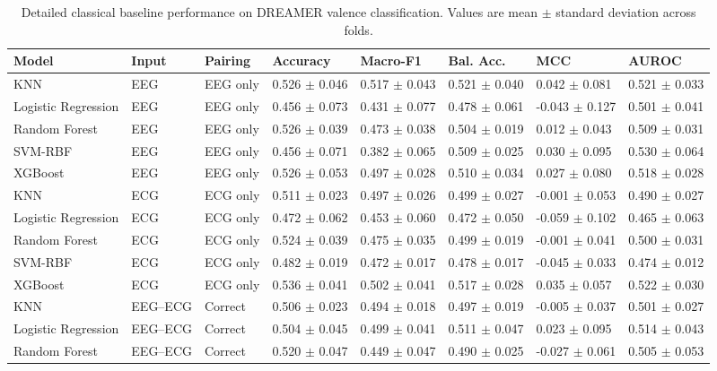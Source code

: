 \begin{table}[!t]
\centering
\caption{Detailed classical baseline performance on DREAMER valence classification. Values are mean $\pm$ standard deviation across folds.}
\label{tab:dreamer_valence_classical_detailed}
\begin{tabular}{llllllll}
\toprule
Model & Input & Pairing & Accuracy & Macro-F1 & Bal. Acc. & MCC & AUROC \\
\midrule
KNN & EEG & EEG only & 0.526 $\pm$ 0.046 & 0.517 $\pm$ 0.043 & 0.521 $\pm$ 0.040 & 0.042 $\pm$ 0.081 & 0.521 $\pm$ 0.033 \\
Logistic Regression & EEG & EEG only & 0.456 $\pm$ 0.073 & 0.431 $\pm$ 0.077 & 0.478 $\pm$ 0.061 & -0.043 $\pm$ 0.127 & 0.501 $\pm$ 0.041 \\
Random Forest & EEG & EEG only & 0.526 $\pm$ 0.039 & 0.473 $\pm$ 0.038 & 0.504 $\pm$ 0.019 & 0.012 $\pm$ 0.043 & 0.509 $\pm$ 0.031 \\
SVM-RBF & EEG & EEG only & 0.456 $\pm$ 0.071 & 0.382 $\pm$ 0.065 & 0.509 $\pm$ 0.025 & 0.030 $\pm$ 0.095 & 0.530 $\pm$ 0.064 \\
XGBoost & EEG & EEG only & 0.526 $\pm$ 0.053 & 0.497 $\pm$ 0.028 & 0.510 $\pm$ 0.034 & 0.027 $\pm$ 0.080 & 0.518 $\pm$ 0.028 \\
KNN & ECG & ECG only & 0.511 $\pm$ 0.023 & 0.497 $\pm$ 0.026 & 0.499 $\pm$ 0.027 & -0.001 $\pm$ 0.053 & 0.490 $\pm$ 0.027 \\
Logistic Regression & ECG & ECG only & 0.472 $\pm$ 0.062 & 0.453 $\pm$ 0.060 & 0.472 $\pm$ 0.050 & -0.059 $\pm$ 0.102 & 0.465 $\pm$ 0.063 \\
Random Forest & ECG & ECG only & 0.524 $\pm$ 0.039 & 0.475 $\pm$ 0.035 & 0.499 $\pm$ 0.019 & -0.001 $\pm$ 0.041 & 0.500 $\pm$ 0.031 \\
SVM-RBF & ECG & ECG only & 0.482 $\pm$ 0.019 & 0.472 $\pm$ 0.017 & 0.478 $\pm$ 0.017 & -0.045 $\pm$ 0.033 & 0.474 $\pm$ 0.012 \\
XGBoost & ECG & ECG only & 0.536 $\pm$ 0.041 & 0.502 $\pm$ 0.041 & 0.517 $\pm$ 0.028 & 0.035 $\pm$ 0.057 & 0.522 $\pm$ 0.030 \\
KNN & EEG--ECG & Correct & 0.506 $\pm$ 0.023 & 0.494 $\pm$ 0.018 & 0.497 $\pm$ 0.019 & -0.005 $\pm$ 0.037 & 0.501 $\pm$ 0.027 \\
Logistic Regression & EEG--ECG & Correct & 0.504 $\pm$ 0.045 & 0.499 $\pm$ 0.041 & 0.511 $\pm$ 0.047 & 0.023 $\pm$ 0.095 & 0.514 $\pm$ 0.043 \\
Random Forest & EEG--ECG & Correct & 0.520 $\pm$ 0.047 & 0.449 $\pm$ 0.047 & 0.490 $\pm$ 0.025 & -0.027 $\pm$ 0.061 & 0.505 $\pm$ 0.053 \\

\end{tabular}
\end{table}
